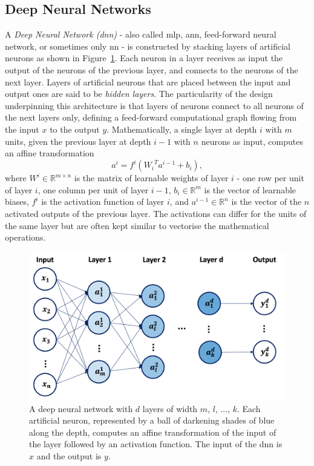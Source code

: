 \subsection{Deep Neural Networks}
A \textit{Deep Neural Network (\gls{dnn})} - also called \gls{mlp}, \gls{ann}, feed-forward neural network, or sometimes only \gls{nn} - is constructed by stacking layers of artificial neurons as shown in Figure~\ref{fig:neuralnet}. Each neuron in a layer receives as input the output of the neurons of the previous layer, and connects to the neurons of the next layer. Layers of artificial neurons that are placed between the input and output ones are said to be \textit{hidden layers}. The particularity of the design underpinning this architecture is that layers of neurons connect to all neurons of the next layers only, defining a feed-forward computational graph flowing from the input $x$ to the output $y$. Mathematically, a single layer at depth $i$ with $m$ units, given the previous layer at depth $i-1$ with $n$ neurons as input, computes an affine transformation
\begin{equation}\label{eq:feedforward}
    a^i = f^i\left({W_i}^T a^{i-1} + b_i\right),
\end{equation}
where $W^i \in \mathbb{R}^{m \times n}$ is the matrix of learnable weights of layer $i$ - one row per unit of layer $i$, one column per unit of layer $i-1$, $b_i \in \mathbb{R}^m$ is the vector of learnable biases, $f^i$ is the activation function of layer $i$, and $a^{i-1} \in \mathbb{R}^n$ is the vector of the $n$ activated outputs of the previous layer. The activations can differ for the units of the same layer but are often kept similar to vectorise the mathematical operations. 

\begin{figure}[h!]
    \center
    \begin{minipage}[l]{0.38\textwidth}
        \caption{A deep neural network with $d$ layers of width $m$, $l$, ..., $k$. Each artificial neuron, represented by a ball of darkening shades of blue along the depth, computes an affine transformation of the input of the layer followed by an activation function. The input of the \gls{dnn} is $x$ and the output is $y$.} 
    \label{fig:neuralnet}
      \end{minipage}
      \begin{minipage}[c]{0.6\textwidth}
        \includegraphics[width=\textwidth]{Images/ML/neuralnet.png}
      \end{minipage}
\end{figure}

